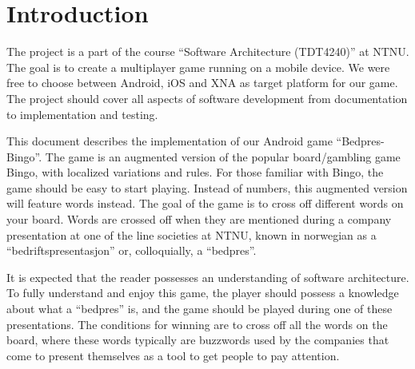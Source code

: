 \section{Introduction}
\label{sec:introduction}

The project is a part of the course ``Software Architecture (TDT4240)'' at
NTNU\@. The goal is to create a multiplayer game running on a mobile device. We
were free to choose between Android, iOS and XNA as target platform for our
game. The project should cover all aspects of software development from
documentation to implementation and testing.

This document describes the implementation of our Android game
``Bedpres-Bingo''. The game is an augmented version of the popular
board/gambling game Bingo, with localized variations and rules. For those
familiar with Bingo, the game should be easy to start playing. Instead of
numbers, this augmented version will feature words instead. The goal of the
game is to cross off different words on your board. Words are crossed off when
they are mentioned during a company presentation at one of the line societies
at NTNU, known in norwegian as a ``bedriftspresentasjon'' or, colloquially,
a ``bedpres''.

It is expected that the reader possesses an understanding of software
architecture. To fully understand and enjoy this game, the player should
possess a knowledge about what a ``bedpres'' is, and the game should be played
during one of these presentations. The conditions for winning are to cross off
all the words on the board, where these words typically are buzzwords used by
the companies that come to present themselves as a tool to get people to pay
attention.
